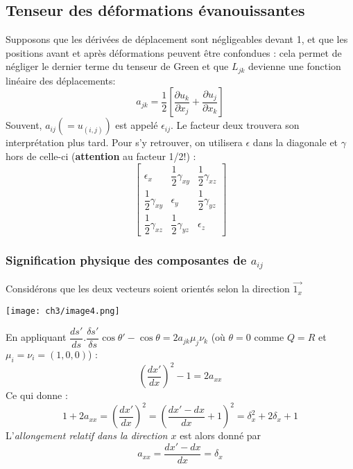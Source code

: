 \subsection{Tenseur des déformations évanouissantes}
Supposons que les dérivées de déplacement sont négligeables devant 1, et que les positions 
avant et après déformations peuvent être confondues : cela permet de négliger le dernier 
terme du tenseur de Green et que $L_{jk}$ devienne une fonction linéaire des déplacements:
\begin{equation}
	a_{jk} = \frac{1}{2}\left[\dfrac{\partial u_k}{\partial x_j}+
	\dfrac{\partial u_j}{\partial x_k}\right]
\end{equation}
Souvent, $a_{ij} (= u_{(i,j)})$ est appelé $\epsilon_{ij}$. Le facteur deux trouvera son 
interprétation plus tard. Pour s'y retrouver, on utilisera $\epsilon$ dans la diagonale et
$\gamma$ hors de celle-ci (\textbf{attention} au facteur 1/2!) :
\begin{equation}
	\left[\begin{array}{ccc}
		\epsilon_x & \dfrac{1}{2}\gamma_{xy} & \dfrac{1}{2}\gamma_{xz}\\
		\dfrac{1}{2}\gamma_{xy} & \epsilon_{y} & \dfrac{1}{2}\gamma_{yz}\\
		\dfrac{1}{2}\gamma_{xz} & \dfrac{1}{2}\gamma_{yz} & \epsilon_{z}
	\end{array}\right]
\end{equation}
    
\subsubsection{Signification physique des composantes de $a_{ij}$}
Considérons que les deux vecteurs soient orientés selon la direction $\vec{1_x}$
\begin{center}
	\texttt{[image: ch3/image4.png]}
\end{center}
        
En appliquant $\dfrac{ds'}{ds}.\dfrac{\delta s'}{\delta s}\cos\theta' - \cos\theta
= 2a_{jk}\mu_j\nu_k$ (où $\theta = 0$ comme $Q=R$ et $\mu_i = \nu_i = (1,0,0)$) :
\begin{equation}
	\left(\dfrac{dx'}{dx}\right)^2 - 1 = 2a_{xx}
\end{equation}
Ce qui donne :
\begin{equation}
	1 + 2a_{xx} = \left(\dfrac{dx'}{dx}\right)^2 = \left(\dfrac{dx'-dx}{dx}+1\right)^2
	= \delta_x^2 + 2\delta_x + 1
\end{equation}
L'\textit{allongement relatif dans la direction $x$} est alors donné par 
\begin{equation}
	a_{xx} = \dfrac{dx'-dx}{dx} = \delta_x
\end{equation}
        
